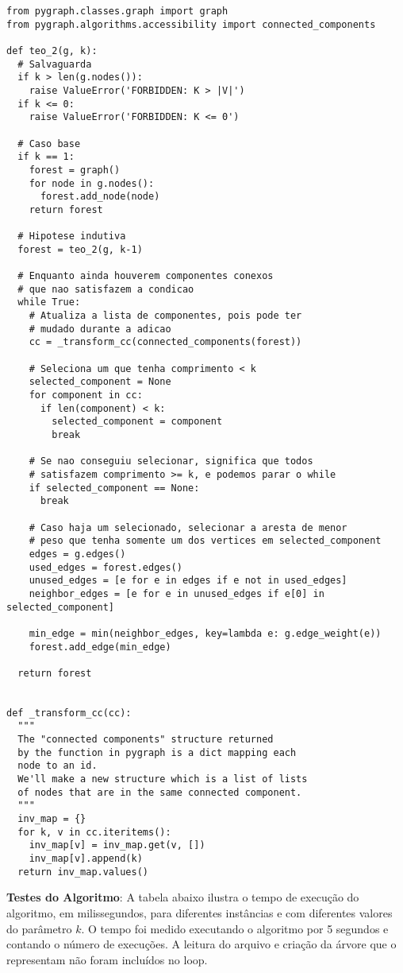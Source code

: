 \documentclass{article}
\begin{document}
{\color{blue}
\begin{verbatim}
from pygraph.classes.graph import graph
from pygraph.algorithms.accessibility import connected_components

def teo_2(g, k):
  # Salvaguarda
  if k > len(g.nodes()):
    raise ValueError('FORBIDDEN: K > |V|')
  if k <= 0:
    raise ValueError('FORBIDDEN: K <= 0')

  # Caso base
  if k == 1:
    forest = graph()
    for node in g.nodes():
      forest.add_node(node)
    return forest

  # Hipotese indutiva
  forest = teo_2(g, k-1)

  # Enquanto ainda houverem componentes conexos
  # que nao satisfazem a condicao
  while True:
    # Atualiza a lista de componentes, pois pode ter
    # mudado durante a adicao
    cc = _transform_cc(connected_components(forest))

    # Seleciona um que tenha comprimento < k
    selected_component = None
    for component in cc:
      if len(component) < k:
        selected_component = component
        break

    # Se nao conseguiu selecionar, significa que todos
    # satisfazem comprimento >= k, e podemos parar o while
    if selected_component == None:
      break

    # Caso haja um selecionado, selecionar a aresta de menor
    # peso que tenha somente um dos vertices em selected_component
    edges = g.edges()
    used_edges = forest.edges()
    unused_edges = [e for e in edges if e not in used_edges]
    neighbor_edges = [e for e in unused_edges if e[0] in selected_component]

    min_edge = min(neighbor_edges, key=lambda e: g.edge_weight(e))
    forest.add_edge(min_edge)

  return forest


def _transform_cc(cc):
  """
  The "connected components" structure returned
  by the function in pygraph is a dict mapping each
  node to an id.
  We'll make a new structure which is a list of lists
  of nodes that are in the same connected component.
  """
  inv_map = {}
  for k, v in cc.iteritems():
    inv_map[v] = inv_map.get(v, [])
    inv_map[v].append(k)
  return inv_map.values()
\end{verbatim}
}

\textbf{Testes do Algoritmo}: A tabela abaixo ilustra o tempo de execução do algoritmo, em milissegundos, para diferentes instâncias e com diferentes valores do parâmetro $k$. O tempo foi medido executando o algoritmo por 5 segundos e contando o número de execuções. A leitura do arquivo e criação da árvore que o representam não foram incluídos no loop.
\end{document}
